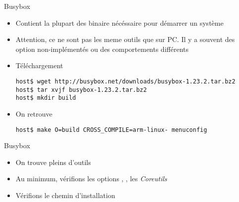 \begin{frame}[fragile=singleslide]{Busybox}
  \begin{itemize}
  \item  Contient la plupart  des binaire  nécéssaire pour  démarrer un
    système
  \item Attention, ce ne  sont pas les meme outils que sur  PC. Il y a
    souvent des option non-implémentés ou des comportements différents
  \item Téléchargement
    \begin{lstlisting}
host$ wget http://busybox.net/downloads/busybox-1.23.2.tar.bz2
host$ tar xvjf busybox-1.23.2.tar.bz2
host$ mkdir build
    \end{lstlisting}
  \item On retrouve 
    \begin{lstlisting}
host$ make O=build CROSS_COMPILE=arm-linux- menuconfig
    \end{lstlisting}
  \end{itemize}
\end{frame}

\begin{frame}[fragile=singleslide]{Busybox}
  \begin{itemize}
  \item On trouve pleins d'outils
  \item    Au   minimum,    vérifions les options    ,   ,    les
    \emph{Coreutils}
  \item Vérifions le chemin d'installation
  \end{itemize}
\end{frame}

